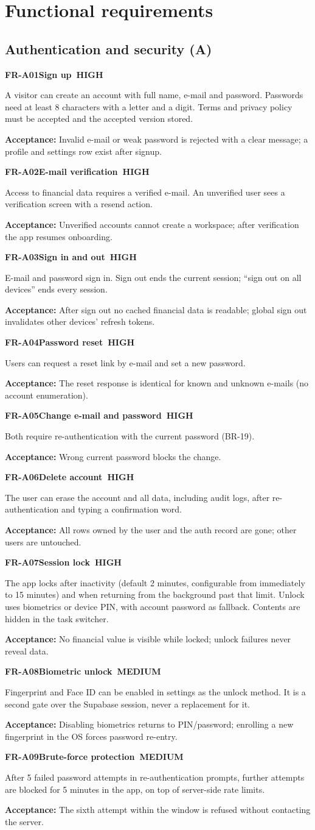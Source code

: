 \documentclass[11pt,a4paper]{article}
\newcommand{\PH}{\colorbox{finlyblue}{\color{white}\scriptsize\bfseries\ HIGH\ }}
\newcommand{\PM}{\colorbox{finlygold}{\color{finlydark}\scriptsize\bfseries\ MEDIUM\ }}
\newcommand{\req}[5]{%
  \begin{tcolorbox}[reqbox]
    {\small\textbf{\textcolor{finlyblue}{#1}}\quad\textbf{#2}\hfill #3}\par\vspace{2pt}
    {\small #4}\par\vspace{2pt}
    {\footnotesize\textcolor{finlytext}{\textbf{Acceptance:} #5}}
  \end{tcolorbox}}
\begin{document}
\section{Functional requirements}

\subsection{Authentication and security (A)}
\req{FR-A01}{Sign up}{\PH}{A visitor can create an account with full name, e-mail and password. Passwords need at least 8 characters with a letter and a digit. Terms and privacy policy must be accepted and the accepted version stored.}
{Invalid e-mail or weak password is rejected with a clear message; a profile and settings row exist after signup.}
\req{FR-A02}{E-mail verification}{\PH}{Access to financial data requires a verified e-mail. An unverified user sees a verification screen with a resend action.}
{Unverified accounts cannot create a workspace; after verification the app resumes onboarding.}
\req{FR-A03}{Sign in and out}{\PH}{E-mail and password sign in. Sign out ends the current session; ``sign out on all devices'' ends every session.}
{After sign out no cached financial data is readable; global sign out invalidates other devices' refresh tokens.}
\req{FR-A04}{Password reset}{\PH}{Users can request a reset link by e-mail and set a new password.}
{The reset response is identical for known and unknown e-mails (no account enumeration).}
\req{FR-A05}{Change e-mail and password}{\PH}{Both require re-authentication with the current password (BR-19).}
{Wrong current password blocks the change.}
\req{FR-A06}{Delete account}{\PH}{The user can erase the account and all data, including audit logs, after re-authentication and typing a confirmation word.}
{All rows owned by the user and the auth record are gone; other users are untouched.}
\req{FR-A07}{Session lock}{\PH}{The app locks after inactivity (default 2 minutes, configurable from immediately to 15 minutes) and when returning from the background past that limit. Unlock uses biometrics or device PIN, with account password as fallback. Contents are hidden in the task switcher.}
{No financial value is visible while locked; unlock failures never reveal data.}
\req{FR-A08}{Biometric unlock}{\PM}{Fingerprint and Face ID can be enabled in settings as the unlock method. It is a second gate over the Supabase session, never a replacement for it.}
{Disabling biometrics returns to PIN/password; enrolling a new fingerprint in the OS forces password re-entry.}
\req{FR-A09}{Brute-force protection}{\PM}{After 5 failed password attempts in re-authentication prompts, further attempts are blocked for 5 minutes in the app, on top of server-side rate limits.}
{The sixth attempt within the window is refused without contacting the server.}
\end{document}
